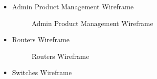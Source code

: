 \documentclass[a4Paper,12pt]{report}
\begin{document}
\begin{itemize}
\item Admin Product Management Wireframe
\begin{figure}[H]
\centering
{}
\caption{Admin Product Management Wireframe}
\end{figure}
\item Routers Wireframe
\begin{figure}[H]
\centering
{}
\caption{Routers Wireframe}
\end{figure}
\item Switches Wireframe
\begin{figure}[H]
\centering
{}

\end{figure}
\end{itemize}
\end{document}
